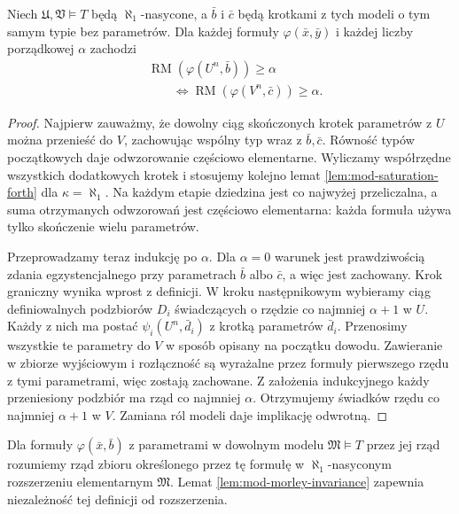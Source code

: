 \begin{lemat}
\label{lem:mod-morley-invariance}
Niech $\mathfrak U,\mathfrak V\models T$ będą
$\aleph_1$-nasycone, a $\bar b$ i $\bar c$
będą krotkami z tych modeli o tym samym
typie bez parametrów. Dla każdej formuły
$\varphi(\bar x,\bar y)$ i każdej liczby
porządkowej $\alpha$ zachodzi
\[
\begin{aligned}
&\operatorname{RM}(\varphi(U^n,\bar b))\geq\alpha\\
&\qquad\Longleftrightarrow
\operatorname{RM}(\varphi(V^n,\bar c))\geq\alpha.
\end{aligned}
\]
\end{lemat}
\begin{proof}
Najpierw zauważmy, że dowolny ciąg skończonych
krotek parametrów z $U$ można przenieść do $V$,
zachowując wspólny typ wraz z $\bar b,\bar c$.
Równość typów początkowych daje odwzorowanie
częściowo elementarne. Wyliczamy współrzędne
wszystkich dodatkowych krotek i stosujemy kolejno
lemat \ref{lem:mod-saturation-forth}
dla $\kappa=\aleph_1$. Na każdym etapie
dziedzina jest co najwyżej przeliczalna,
a suma otrzymanych odwzorowań jest częściowo
elementarna: każda formuła używa tylko
skończenie wielu parametrów.

Przeprowadzamy teraz indukcję po $\alpha$.
Dla $\alpha=0$ warunek jest prawdziwością
zdania egzystencjalnego przy parametrach
$\bar b$ albo $\bar c$, a więc jest zachowany.
Krok graniczny wynika wprost z definicji.
W kroku następnikowym wybieramy ciąg
definiowalnych podzbiorów $D_i$ świadczących
o rzędzie co najmniej $\alpha+1$ w $U$.
Każdy z nich ma postać
$\psi_i(U^n,\bar d_i)$ z krotką parametrów
$\bar d_i$. Przenosimy wszystkie te parametry
do $V$ w sposób opisany na początku dowodu.
Zawieranie w zbiorze wyjściowym i rozłączność
są wyrażalne przez formuły pierwszego rzędu
z tymi parametrami, więc zostają zachowane.
Z założenia indukcyjnego każdy przeniesiony
podzbiór ma rząd co najmniej $\alpha$.
Otrzymujemy świadków rzędu co najmniej
$\alpha+1$ w $V$. Zamiana ról modeli daje
implikację odwrotną.
\end{proof}

Dla formuły $\varphi(\bar x,\bar b)$ z parametrami
w dowolnym modelu $\mathfrak M\models T$
przez jej rząd rozumiemy rząd zbioru określonego
przez tę formułę w $\aleph_1$-nasyconym
rozszerzeniu elementarnym $\mathfrak M$.
Lemat \ref{lem:mod-morley-invariance} zapewnia
niezależność tej definicji od rozszerzenia.

